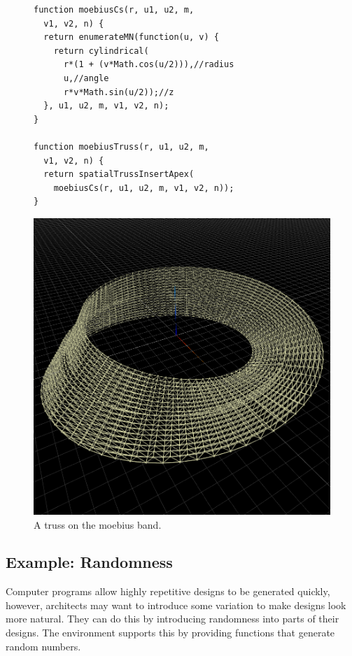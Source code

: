 \begin{figure}
\begin{minipage}{0.5\textwidth}
\begin{verbatim}
function moebiusCs(r, u1, u2, m,
  v1, v2, n) {
  return enumerateMN(function(u, v) {
    return cylindrical(
      r*(1 + (v*Math.cos(u/2))),//radius
      u,//angle
      r*v*Math.sin(u/2));//z
  }, u1, u2, m, v1, v2, n);
}

function moebiusTruss(r, u1, u2, m,
  v1, v2, n) {
  return spatialTrussInsertApex(
    moebiusCs(r, u1, u2, m, v1, v2, n));
}
\end{verbatim}
\end{minipage}%
\begin{minipage}{0.5\textwidth}
  \includegraphics[width=1.0\textwidth]{./images/detail_examples/moebius_truss_crop}
\end{minipage}
\caption{A truss on the moebius band.}
\label{fig:truss:moebius}
\end{figure}


\subsection{Example: Randomness}
Computer programs allow highly repetitive designs to be generated quickly, however, architects may want to introduce some variation to make designs look more natural.
They can do this by introducing randomness into parts of their designs.
The environment supports this by providing functions that generate random numbers.

